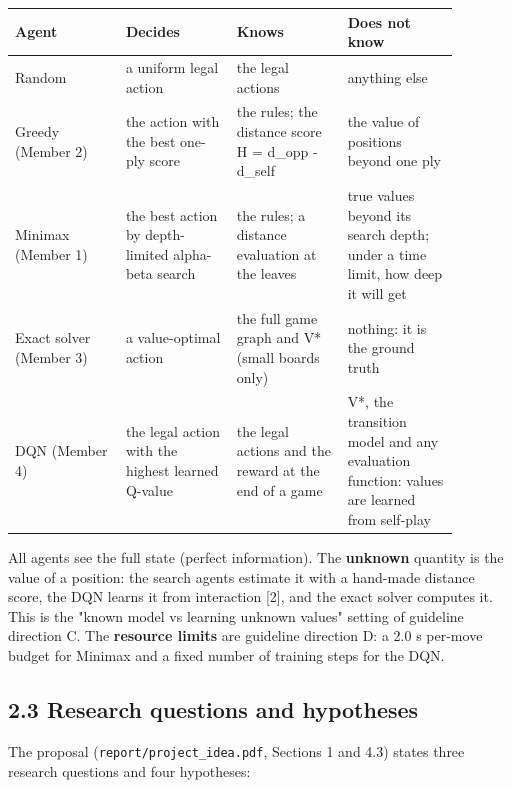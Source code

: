 \documentclass[11pt]{article}
\begin{document}
\begin{center}\scriptsize
\begin{longtable}{p{0.22\linewidth}p{0.22\linewidth}p{0.22\linewidth}p{0.22\linewidth}}
\toprule
Agent & Decides & Knows & Does not know \\
\midrule
Random & a uniform legal action & the legal actions & anything else \\
Greedy (Member 2) & the action with the best one-ply score & the rules; the distance score H = d\_opp - d\_self & the value of positions beyond one ply \\
Minimax (Member 1) & the best action by depth-limited alpha-beta search & the rules; a distance evaluation at the leaves & true values beyond its search depth; under a time limit, how deep it will get \\
Exact solver (Member 3) & a value-optimal action & the full game graph and V* (small boards only) & nothing: it is the ground truth \\
DQN (Member 4) & the legal action with the highest learned Q-value & the legal actions and the reward at the end of a game & V*, the transition model and any evaluation function: values are learned from self-play \\
\bottomrule
\end{longtable}
\end{center}

All agents see the full state (perfect information). The \textbf{unknown} quantity is the value of a
position: the search agents estimate it with a hand-made distance score, the DQN learns it from
interaction [2], and the exact solver computes it. This is the "known model vs learning unknown
values" setting of guideline direction C. The \textbf{resource limits} are guideline direction D: a
2.0 s per-move budget for Minimax and a fixed number of training steps for the DQN.

\subsection{2.3 Research questions and hypotheses}

The proposal (\texttt{report/project\_idea.pdf}, Sections 1 and 4.3) states three research questions
and four hypotheses:
\end{document}
